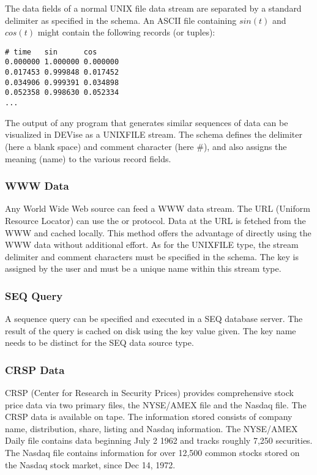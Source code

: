 The data fields of a normal UNIX file data stream are separated by a standard
delimiter as specified in the schema. An ASCII file containing $sin(t)$ and
$cos(t)$ might contain the following records (or tuples):

\begin{verbatim}
# time   sin      cos
0.000000 1.000000 0.000000
0.017453 0.999848 0.017452
0.034906 0.999391 0.034898
0.052358 0.998630 0.052334
... 
\end{verbatim}

The output of any program that generates similar sequences of data can be
visualized in DEVise as a UNIXFILE stream. The schema defines the delimiter
(here a blank space) and comment character (here \#), and also assigns the
meaning (name) to the various record fields.

\subsubsection{WWW Data}

Any World Wide Web source can feed a WWW data stream. The URL (Uniform Resource
Locator) can use the  or  protocol. Data at the URL is
fetched from the WWW and cached locally. This method offers the advantage of
directly using the WWW data without additional effort. As for the UNIXFILE type,
the stream delimiter and comment characters must be specified in the schema. The
key is assigned by the user and must be a unique name within this stream type.

\subsubsection{SEQ Query}

A sequence query can be specified and executed in a SEQ database server. The
result of the query is cached on disk using the key value given. The key name
needs to be distinct for the SEQ data source type.

\subsubsection{CRSP Data}

CRSP (Center for Research in Security Prices) provides comprehensive stock price
data via two primary files, the NYSE/AMEX file and the Nasdaq file. The CRSP
data is available on tape. The information stored consists of company name,
distribution, share, listing and Nasdaq information. The NYSE/AMEX Daily file
contains data beginning July 2 1962 and tracks roughly 7,250 securities. The
Nasdaq file contains information for over 12,500 common stocks stored on the
Nasdaq stock market, since Dec 14, 1972.

